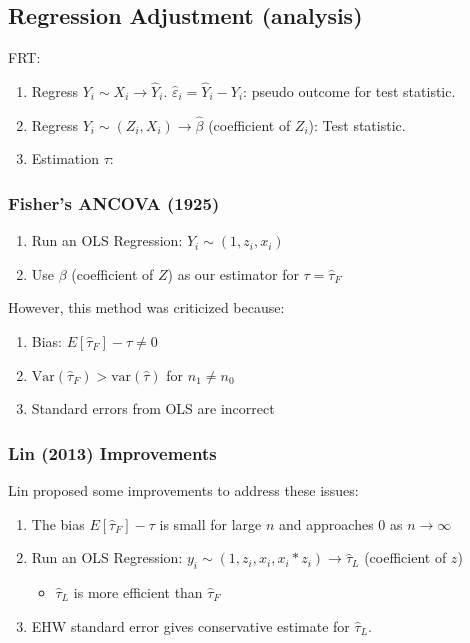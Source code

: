 \subsection{Regression Adjustment (analysis)}

FRT:
\begin{enumerate}
    \item Regress $Y_i \sim X_i \rightarrow \hat{Y}_i$. 
    $\hat{\varepsilon}_i = \hat{Y}_i - Y_i$: pseudo outcome for test statistic.
    \item Regress $Y_i \sim (Z_i, X_i) \rightarrow \hat{\beta}$ (coefficient of $Z_i$): Test statistic.
    \item Estimation $\tau$:
\end{enumerate}

\subsubsection{Fisher's ANCOVA (1925)}

\begin{enumerate}
    \item Run an OLS Regression: $Y_i \sim (1, z_i, x_i)$
    \item Use $\beta$ (coefficient of $Z$) as our estimator for $\tau = \hat{\tau}_F$
\end{enumerate}

However, this method was criticized because:
\begin{enumerate}
    \item Bias: $E[\hat{\tau}_F] - \tau \neq 0$
    \item $\text{Var}(\hat{\tau}_F) > \text{var}(\hat{\tau})$ for $n_1 \neq n_0$
    \item Standard errors from OLS are incorrect
\end{enumerate}

\subsubsection{Lin (2013) Improvements}

Lin proposed some improvements to address these issues:
\begin{enumerate}
    \item The bias $E[\hat{\tau}_F] - \tau$ is small for large $n$ and approaches 0 as $n \rightarrow \infty$
    \item Run an OLS Regression: $y_i \sim (1, z_i, x_i, x_i * z_i) \rightarrow \hat{\tau}_L$ (coefficient of $z$)
    \begin{itemize}
        \item $\hat{\tau}_L$ is more efficient than $\hat{\tau}_F$
    \end{itemize}
    \item EHW standard error gives conservative estimate for $\hat{\tau}_L$.
\end{enumerate}


